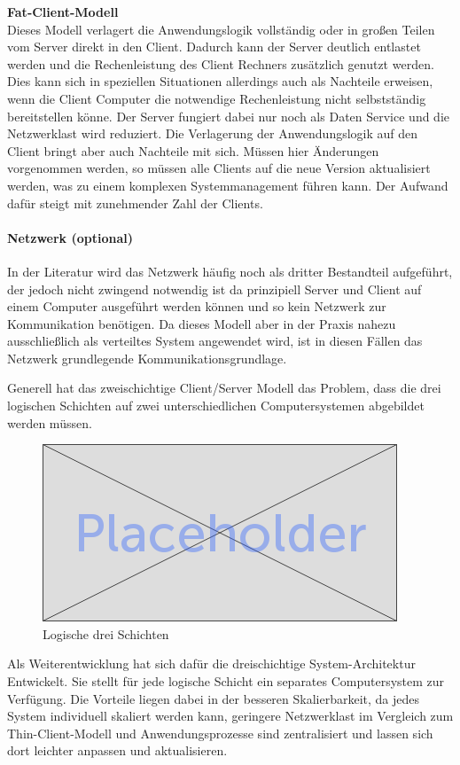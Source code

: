   \textbf{Fat-Client-Modell}\\
	Dieses Modell verlagert die Anwendungslogik vollständig oder in großen Teilen vom Server direkt in den Client. Dadurch kann der Server deutlich entlastet werden und die Rechenleistung des Client Rechners zusätzlich genutzt werden. Dies kann sich in speziellen Situationen allerdings auch als Nachteile erweisen, wenn die Client Computer die notwendige Rechenleistung nicht selbstständig bereitstellen könne. Der Server fungiert dabei nur noch als Daten Service und die Netzwerklast wird reduziert. Die Verlagerung der Anwendungslogik auf den Client bringt aber auch Nachteile mit sich. Müssen hier Änderungen vorgenommen werden, so müssen alle Clients auf die neue Version aktualisiert werden, was zu einem komplexen Systemmanagement führen kann. Der Aufwand dafür steigt mit zunehmender Zahl der Clients.
	
	\paragraph{Netzwerk (optional)}
	In der Literatur wird das Netzwerk häufig noch als dritter Bestandteil aufgeführt, der jedoch nicht zwingend notwendig ist da prinzipiell Server und Client auf einem Computer ausgeführt werden können und so kein Netzwerk zur Kommunikation benötigen. Da dieses Modell aber in der Praxis nahezu ausschließlich als verteiltes System angewendet wird, ist in diesen Fällen das Netzwerk grundlegende Kommunikationsgrundlage.
	
	Generell hat das zweischichtige Client/Server Modell das Problem, dass die drei logischen Schichten auf zwei unterschiedlichen Computersystemen abgebildet werden müssen. \\
	
	\begin{figure}[h]
		\centering
		\includegraphics[width=0.5\linewidth]{images/placeholder}
		\caption{Logische drei Schichten}
		\label{fig:log3schichten}
	\end{figure}
	
	Als Weiterentwicklung hat sich dafür die dreischichtige System-Architektur Entwickelt. Sie stellt für jede logische Schicht ein separates Computersystem zur Verfügung. Die Vorteile liegen dabei in der besseren Skalierbarkeit, da jedes System individuell skaliert werden kann, geringere Netzwerklast im Vergleich zum Thin-Client-Modell und Anwendungsprozesse sind zentralisiert und lassen sich dort leichter anpassen und aktualisieren.
	


